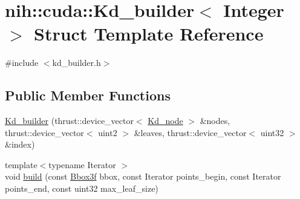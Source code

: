 \hypertarget{structnih_1_1cuda_1_1_kd__builder}{
\section{nih\-:\-:cuda\-:\-:\-Kd\-\_\-builder$<$ \-Integer $>$ \-Struct \-Template \-Reference}
\label{structnih_1_1cuda_1_1_kd__builder}
}


{\ttfamily \#include $<$kd\-\_\-builder.\-h$>$}

\subsection*{\-Public \-Member \-Functions}
\begin{DoxyCompactItemize}
\item 
\hyperlink{structnih_1_1cuda_1_1_kd__builder_a8eca3f0a2461343c1c56a88abd11ce1d}{\-Kd\-\_\-builder} (thrust\-::device\-\_\-vector$<$ \hyperlink{structnih_1_1_kd__node}{\-Kd\-\_\-node} $>$ \&nodes, thrust\-::device\-\_\-vector$<$ uint2 $>$ \&leaves, thrust\-::device\-\_\-vector$<$ uint32 $>$ \&index)
\item 
{\footnotesize template$<$typename Iterator $>$ }\\void \hyperlink{structnih_1_1cuda_1_1_kd__builder_a54f3b9d2c72fa0149181527481d17c7b}{build} (const \hyperlink{structnih_1_1_bbox}{\-Bbox3f} bbox, const \-Iterator points\-\_\-begin, const \-Iterator points\-\_\-end, const uint32 max\-\_\-leaf\-\_\-size)
\end{DoxyCompactItemize}
